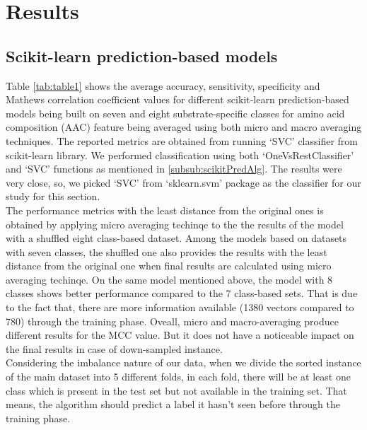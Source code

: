\section {Results}
\label{sec:results}

\subsection{Scikit-learn prediction-based models}
        
    Table \ref{tab:table1} shows the average accuracy, sensitivity, specificity and Mathews correlation coefficient values for different 
    scikit-learn prediction-based models being built on seven and eight substrate-specific classes for amino acid composition (AAC) 
    feature being averaged using both micro and macro averaging techniques.
    The reported metrics are obtained from running `SVC' classifier from scikit-learn library. We performed classification using both 
    `OneVsRestClassifier' and `SVC' functions as mentioned in \ref{subsub:scikitPredAlg}. The results were very close, so, we picked 
    `SVC' from `sklearn.svm' package as the classifier for our study for this section.\\

    The performance metrics with the least distance from the original ones is obtained by applying micro averaging techinqe to the 
    the results of the model with a shuffled eight class-based dataset. Among the models based on datasets with seven classes, 
    the shuffled one also provides the results with the least distance from the original one when final results are calculated 
    using micro averaging techinqe. On the same model mentioned above, the model with 8 classes shows better performance 
    compared to the 7 class-based sets. That is due to the fact that, there are more information available 
    (1380 vectors compared to 780) through the training phase. Oveall, micro and macro-averaging produce different results 
    for the MCC value. But it does not have a noticeable impact on the final results in case of down-sampled instance.\\

    Considering the imbalance nature of our data, when we divide the sorted instance of the main dataset into 5 different folds, 
    in each fold, there will be at least one class which is present in the test set but not available in the training set. That means, 
    the algorithm should predict a label it hasn’t seen before through the training phase.\\


